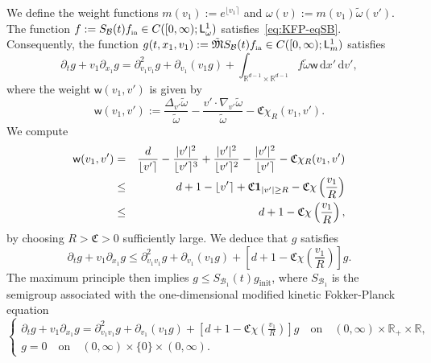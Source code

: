 \documentclass[11pt]{amsart}
\theoremstyle{definition}
\theoremstyle{remark}
\numberwithin{equation}{section}
\newcommand\R{{\mathbb R}}
\def\BB{{\mathcal B}}
\def\fM{{\mathfrak M}}
\newcommand{\dd}{{\, \mathrm d}}
\newcommand{\init}{\text{{\tiny {\rm in}}}}
\newcommand{\sfL}{\mathsf{L}}
\newcommand{\wangle}[1]{\lfloor #1 \rceil}
\begin{document}
\smallskip
We define the weight functions $m(v_1) := e^{\wangle{v_1}}$ and $\omega(v) := m(v_1) \tilde \omega(v')$. The function $f := S_\BB(t) f_\init \in C([0,\infty); \sfL^1_\omega)$ satisfies~\eqref{eq:KFP-eqSB}. Consequently, the function $g(t,x_1,v_1) := \tilde \fM S_\BB(t) f_\init \in C([0,\infty); \sfL^1_m)$ satisfies
\begin{equation*}
  \partial_t g + v_1 \partial_{x_1} g = \partial^2_{v_1v_1} g + \partial_{v_1} (v_1 g) + \int_{\R^{d-1} \times \R^{d-1}} f \tilde \omega \mathsf w \dd x'\dd v',
\end{equation*}
where the weight $\mathsf w(v_1,v')$ is given by
\begin{equation*}
  \mathsf w(v_1,v') := \frac{\Delta_{v'} \tilde \omega}{\tilde \omega} - \frac{v' \cdot \nabla_{v'} \tilde \omega}{\tilde \omega} - \mathfrak C \chi_R(v_1,v').
\end{equation*}
We compute
\begin{eqnarray*}
  \mathsf w(v_1,v')
  &=& \frac{d}{\wangle{v'}} - \frac{|v'|^2}{\wangle{v'}^3} + \frac{|v'|^2}{\wangle{v'}^2} - \frac{|v'|^2}{\wangle{v'}} - \mathfrak{C} \chi_R(v_1,v') \\
  &\le& d+1 - \wangle{v'} + \mathfrak{C} {\bf 1}_{|v'| \ge R} - \mathfrak{C} \chi\left( \frac{v_1}{R} \right) \\
  &\le& d+1 - \mathfrak{C} \chi\left( \frac{v_1}{R} \right),
\end{eqnarray*}
by choosing $R > \mathfrak{C} > 0$ sufficiently large. We deduce that $g$ satisfies
\begin{equation*}
  \partial_t g + v_1 \partial_{x_1} g \le \partial^2_{v_1v_1} g + \partial_{v_1} (v_1 g) + \left[d+1 - \mathfrak{C} \chi\left(\frac{v_1}{R}\right) \right] g.
\end{equation*}
The maximum principle then implies $g \le S_{\BB_1}(t) g_{\text{init}}$, where $S_{\BB_1}$ is the semigroup associated with the one-dimensional modified kinetic Fokker-Planck equation
\begin{equation}
  \label{eq:KFP-eqSB-dim1}
  \left\{
    \begin{array}{l}
      \partial_t g + v_1 \partial_{x_1} g  =\partial^2_{v_1v_1}g + \partial_{v_1} (v_1 g) + \left[ d+1 - \mathfrak{C} \chi\left(\frac{v_1}{R}\right)\right] g \quad \text{on}\quad (0,\infty) \times \R_+ \times \R,   \\[3mm]
      g = 0 \quad \text{on}\quad (0,\infty) \times \{0 \} \times (0,\infty).
    \end{array}
  \right.
\end{equation}
\end{document}
